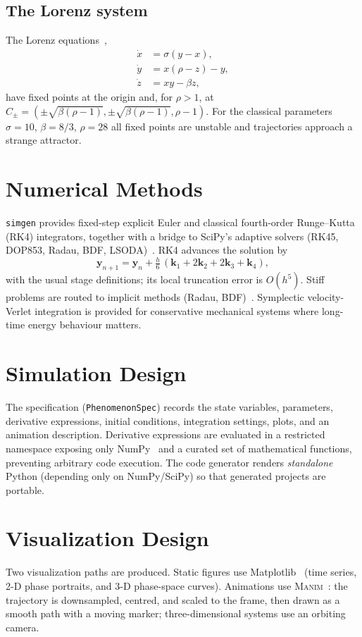 \documentclass[11pt,a4paper]{article}
\begin{document}
\subsection{The Lorenz system}
The Lorenz equations~\cite{lorenz1963},
\begin{align}
  \dot{x} &= \sigma(y - x), \\
  \dot{y} &= x(\rho - z) - y, \\
  \dot{z} &= xy - \beta z,
\end{align}
have fixed points at the origin and, for $\rho > 1$, at
$C_\pm = (\pm\sqrt{\beta(\rho-1)}, \pm\sqrt{\beta(\rho-1)}, \rho-1)$. For the
classical parameters $\sigma = 10$, $\beta = 8/3$, $\rho = 28$ all fixed points
are unstable and trajectories approach a strange attractor.

\section{Numerical Methods}
\texttt{simgen} provides fixed-step explicit Euler and classical fourth-order
Runge--Kutta (RK4) integrators, together with a bridge to SciPy's adaptive
solvers (RK45, DOP853, Radau, BDF, LSODA)~\cite{virtanen2020scipy,hairer1993}.
RK4 advances the solution by
\begin{equation}
  \mathbf{y}_{n+1} = \mathbf{y}_n + \tfrac{h}{6}\,
  (\mathbf{k}_1 + 2\mathbf{k}_2 + 2\mathbf{k}_3 + \mathbf{k}_4),
\end{equation}
with the usual stage definitions; its local truncation error is $O(h^5)$.
Stiff problems are routed to implicit methods (Radau, BDF)~\cite{ascher1998}.
Symplectic velocity-Verlet integration is provided for conservative mechanical
systems where long-time energy behaviour matters.

\section{Simulation Design}
The specification (\texttt{PhenomenonSpec}) records the state variables,
parameters, derivative expressions, initial conditions, integration settings,
plots, and an animation description. Derivative expressions are evaluated in a
restricted namespace exposing only NumPy~\cite{harris2020numpy} and a curated set
of mathematical functions, preventing arbitrary code execution. The code
generator renders \emph{standalone} Python (depending only on NumPy/SciPy) so
that generated projects are portable.

\section{Visualization Design}
Two visualization paths are produced. Static figures use
Matplotlib~\cite{matplotlib_docs} (time series, 2-D phase portraits, and 3-D
phase-space curves). Animations use \textsc{Manim}~\cite{manim_docs}: the
trajectory is downsampled, centred, and scaled to the frame, then drawn as a
smooth path with a moving marker; three-dimensional systems use an orbiting
camera.
\end{document}
